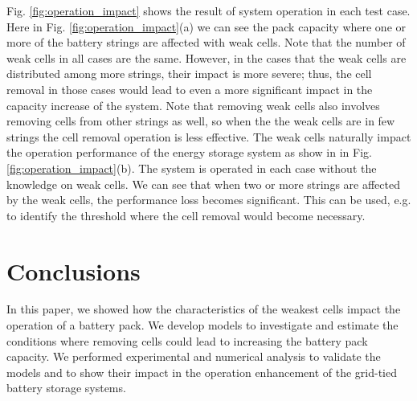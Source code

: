 \documentclass[10pt,twocolumn]{IEEEtran}
\begin{document}
Fig. \ref{fig:operation_impact} shows the result of system operation in each test case. Here in Fig. \ref{fig:operation_impact}(a) we can see the pack capacity where one or more of the battery strings are affected with weak cells.
Note that the number of weak cells in all cases are the same. However,  in the cases that the weak cells are distributed among more strings, their impact is more severe; thus, the cell removal in those cases would lead to even a more significant impact in the capacity increase of the system.  Note that removing weak cells also involves removing cells from other strings as well, so when the the weak cells are in few strings the cell removal operation is less effective. The weak cells naturally impact the operation performance of the energy storage system as show in in Fig. \ref{fig:operation_impact}(b). The system is operated in each case without the knowledge on weak cells. We can see that when two or more  strings are affected by the weak cells, the performance loss becomes significant. This can be used, e.g. to identify the threshold where the cell removal would become necessary.




\section{Conclusions}

In this paper, we showed how the  characteristics of the weakest cells impact the operation of a battery pack. We develop models to investigate and estimate the conditions where removing cells could lead to increasing the battery pack capacity. We performed experimental and numerical analysis to validate the models and to show their impact in the operation enhancement of the grid-tied battery storage systems.





\end{document}

